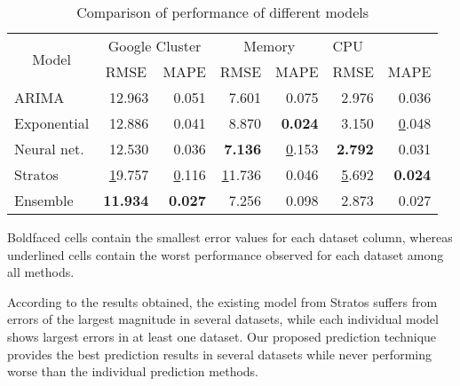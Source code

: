 \begin{table}[]
\centering
\caption{Comparison of performance of different models}
\label{my-label}
\begin{tabular}{|l|r|r|r|r|r|r|}
\hline
\multicolumn{1}{|c|}{\multirow{2}{*}{Model}} & \multicolumn{2}{c|}{Google Cluster}                   & \multicolumn{2}{c|}{Memory}                & \multicolumn{2}{l|}{CPU}                              \\ \cline{2-7} 
\multicolumn{1}{|c|}{}                       & \multicolumn{1}{c|}{RMSE} & \multicolumn{1}{c|}{MAPE} & RMSE           & \multicolumn{1}{l|}{MAPE} & \multicolumn{1}{l|}{RMSE} & \multicolumn{1}{l|}{MAPE} \\ \hline
ARIMA                                        & 12.963                    & 0.051                     & 7.601          & 0.075                     & 2.976                     & 0.036                     \\ \hline
Exponential                                  & 12.886                    & 0.041                     & 8.870          & \textbf{0.024}            & 3.150                     & {\ul 0.048}               \\ \hline
Neural net.                                  & 12.530                    & 0.036                     & \textbf{7.136} & {\ul 0.153}               & \textbf{2.792}            & 0.031                     \\ \hline
Stratos                                      & {\ul 19.757}              & {\ul 0.116}               & {\ul 11.736}   & 0.046                     & {\ul 5.692}               & \textbf{0.024}            \\ \hline
Ensemble                                     & \textbf{11.934}           & \textbf{0.027}            & 7.256          & 0.098                     & 2.873                     & 0.027                     \\ \hline
\end{tabular}
\end{table}

Boldfaced cells contain the smallest error values for each dataset column, whereas underlined cells contain the worst performance observed for each dataset among all methods.

According to the results obtained, the existing model from Stratos suffers from errors of the largest magnitude in several datasets, while each individual model shows largest errors in at least one dataset. Our proposed prediction technique provides the best prediction results in several datasets while never performing worse than the individual prediction methods.